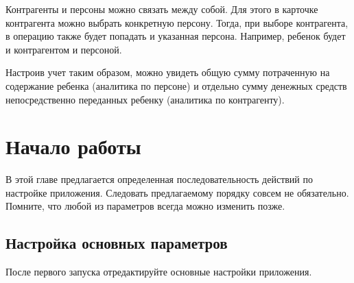 \documentclass[a4paper,10pt,russian]{sphinxmanual}
\begin{document}
\sphinxAtStartPar
Контрагенты и персоны можно связать между собой. Для этого в карточке контрагента можно выбрать конкретную персону. Тогда,
при выборе контрагента, в операцию также будет попадать и указанная персона. Например, ребенок будет и контрагентом и персоной.

\sphinxAtStartPar
Настроив учет таким образом, можно увидеть общую сумму потраченную на содержание ребенка (аналитика по персоне)
и отдельно сумму денежных средств непосредственно переданных ребенку (аналитика по контрагенту).

\sphinxstepscope


\chapter{Начало работы}
\label{\detokenize{getting-started:id1}}\label{\detokenize{getting-started::doc}}
\sphinxAtStartPar
В этой главе предлагается определенная последовательность действий по настройке приложения. Следовать предлагаемому порядку совсем не обязательно. Помните, что любой из параметров всегда можно изменить позже.


\section{Настройка основных параметров}
\label{\detokenize{getting-started:id2}}
\sphinxAtStartPar
После первого запуска отредактируйте основные настройки приложения.

\noindent{}
\noindent{}
\noindent{}
\end{document}
